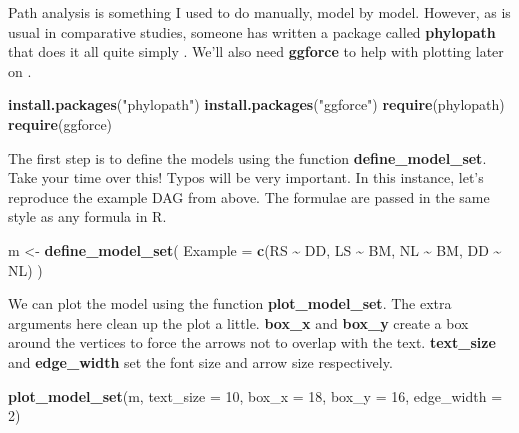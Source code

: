 \documentclass[
]{book}
\newenvironment{Shaded}{\begin{snugshade}}{\end{snugshade}}
\newcommand{\DataTypeTok}[1]{\textcolor[rgb]{0.13,0.29,0.53}{#1}}
\newcommand{\DecValTok}[1]{\textcolor[rgb]{0.00,0.00,0.81}{#1}}
\newcommand{\KeywordTok}[1]{\textcolor[rgb]{0.13,0.29,0.53}{\textbf{#1}}}
\newcommand{\NormalTok}[1]{#1}
\newcommand{\OperatorTok}[1]{\textcolor[rgb]{0.81,0.36,0.00}{\textbf{#1}}}
\newcommand{\StringTok}[1]{\textcolor[rgb]{0.31,0.60,0.02}{#1}}
\begin{document}
Path analysis is something I used to do manually, model by model. However, as is usual in comparative studies, someone has written a package called \textbf{phylopath} that does it all quite simply \citep{phylopath}. We'll also need \textbf{ggforce} to help with plotting later on \citep{ggforce}.

\begin{Shaded}
\begin{Highlighting}[]
\KeywordTok{install.packages}\NormalTok{(}\StringTok{"phylopath"}\NormalTok{)}
\KeywordTok{install.packages}\NormalTok{(}\StringTok{"ggforce"}\NormalTok{)}
\KeywordTok{require}\NormalTok{(phylopath)}
\KeywordTok{require}\NormalTok{(ggforce)}
\end{Highlighting}
\end{Shaded}

The first step is to define the models using the function \textbf{define\_model\_set}. Take your time over this! Typos will be very important. In this instance, let's reproduce the example DAG from above. The formulae are passed in the same style as any formula in R.

\begin{Shaded}
\begin{Highlighting}[]
\NormalTok{m \textless{}{-}}\StringTok{ }\KeywordTok{define\_model\_set}\NormalTok{(}
  \DataTypeTok{Example =} \KeywordTok{c}\NormalTok{(RS }\OperatorTok{\textasciitilde{}}\StringTok{ }\NormalTok{DD, LS }\OperatorTok{\textasciitilde{}}\StringTok{ }\NormalTok{BM, NL }\OperatorTok{\textasciitilde{}}\StringTok{ }\NormalTok{BM, DD }\OperatorTok{\textasciitilde{}}\StringTok{ }\NormalTok{NL)}
\NormalTok{)}
\end{Highlighting}
\end{Shaded}

We can plot the model using the function \textbf{plot\_model\_set}. The extra arguments here clean up the plot a little. \textbf{box\_x} and \textbf{box\_y} create a box around the vertices to force the arrows not to overlap with the text. \textbf{text\_size} and \textbf{edge\_width} set the font size and arrow size respectively.

\begin{Shaded}
\begin{Highlighting}[]
\KeywordTok{plot\_model\_set}\NormalTok{(m, }\DataTypeTok{text\_size =} \DecValTok{10}\NormalTok{,}
               \DataTypeTok{box\_x =} \DecValTok{18}\NormalTok{, }\DataTypeTok{box\_y =} \DecValTok{16}\NormalTok{,}
               \DataTypeTok{edge\_width =} \DecValTok{2}\NormalTok{)}
\end{Highlighting}
\end{Shaded}
\end{document}
